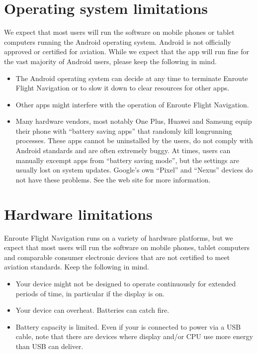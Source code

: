 \documentclass[letterpaper,10pt,english]{sphinxmanual}
\begin{document}
\section{Operating system limitations}
\label{\detokenize{01-intro/think:operating-system-limitations}}
We expect that most users will run the software on mobile phones or tablet
computers running the Android operating system.  Android is not officially
approved or certified for aviation.  While we expect that the app will run fine
for the vast majority of Android users, please keep the following in mind.
\begin{itemize}
\item {} 
The Android operating system can decide at any time to terminate Enroute
Flight Navigation or to slow it down to clear resources for other apps.

\item {} 
Other apps might interfere with the operation of Enroute Flight Navigation.

\item {} 
Many hardware vendors, most notably One Plus, Huawei and Samsung equip their
phone with “battery saving apps” that randomly kill long\sphinxhyphen{}running processes.
These apps cannot be uninstalled by the users, do not comply with Android
standards and are often extremely buggy.  At times, users can manually excempt
apps from “battery saving mode”, but the settings are usually lost on system
updates.  Google’s own “Pixel” and “Nexus” devices do not have these problems.
See the web site  for more
information.

\end{itemize}


\section{Hardware limitations}
\label{\detokenize{01-intro/think:hardware-limitations}}
Enroute Flight Navigation runs on a variety of hardware platforms, but we expect
that most users will run the software on mobile phones, tablet computers and
comparable consumer electronic devices that are not certified to meet aviation
standards.  Keep the following in mind.
\begin{itemize}
\item {} 
Your device might not be designed to operate continuously for extended periods
of time, in particular if the display is on.

\item {} 
Your device can overheat. Batteries can catch fire.

\item {} 
Battery capacity is limited.  Even if your is connected to power via a USB
cable, note that there are devices where display and/or CPU use more energy
than USB can deliver.

\end{itemize}
\end{document}
